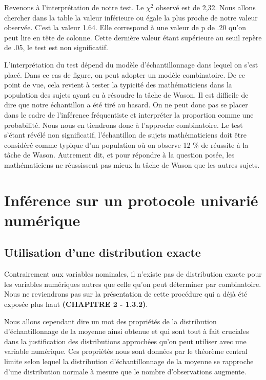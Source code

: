 \documentclass[]{book}
\theoremstyle{definition}
\theoremstyle{definition}
\theoremstyle{definition}
\theoremstyle{remark}
\begin{document}
Revenons à l'interprétation de notre test. Le \(\chi^2\) observé est de
2,32. Nous allons chercher dans la table la valeur inférieure ou égale
la plus proche de notre valeur observée. C'est la valeur 1.64. Elle
correspond à une valeur de p de .20 qu'on peut lire en tête de colonne.
Cette dernière valeur étant supérieure au seuil repère de .05, le test
est non significatif.

L'interprétation du test dépend du modèle d'échantillonnage dans lequel
on s'est placé. Dans ce cas de figure, on peut adopter un modèle
combinatoire. De ce point de vue, cela revient à tester la typicité des
mathématiciens dans la population des sujets ayant eu à résoudre la
tâche de Wason. Il est difficile de dire que notre échantillon a été
tiré au hasard. On ne peut donc pas se placer dans le cadre de
l'inférence fréquentiste et interpréter la proportion comme une
probabilité. Nous nous en tiendrons donc à l'approche combinatoire. Le
test s'étant révélé non significatif, l'échantillon de sujets
mathématiciens doit être considéré comme typique d'un population où on
observe 12 \% de réussite à la tâche de Wason. Autrement dit, et pour
répondre à la question posée, les mathématiciens ne réussissent pas
mieux la tâche de Wason que les autres sujets.

\hypertarget{inference-sur-un-protocole-univarie-numerique}{%
\section{Inférence sur un protocole univarié
numérique}\label{inference-sur-un-protocole-univarie-numerique}}

\hypertarget{utilisation-dune-distribution-exacte-1}{%
\subsection{Utilisation d'une distribution
exacte}\label{utilisation-dune-distribution-exacte-1}}

Contrairement aux variables nominales, il n'existe pas de distribution
exacte pour les variables numériques autres que celle qu'on peut
déterminer par combinatoire. Nous ne reviendrons pas sur la présentation
de cette procédure qui a déjà été exposée plus haut \textbf{(CHAPITRE 2
- 1.3.2)}.

Nous allons cependant dire un mot des propriétés de la distribution
d'échantillonnage de la moyenne ainsi obtenue et qui sont tout à fait
cruciales dans la justification des distributions approchées qu'on peut
utiliser avec une variable numérique. Ces propriétés nous sont données
par le théorème central limite selon lequel la distribution
d'échantillonnage de la moyenne se rapproche d'une distribution normale
à mesure que le nombre d'observations augmente.
\end{document}
